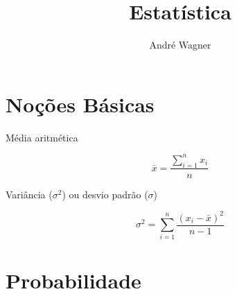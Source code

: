 \documentclass[a4paper, twocolumn]{article}
\author{André Wagner}
\title{Estatística}
\date{}
\begin{document}
\section{Noções Básicas}

Média aritmética

\[ \bar{x} = \frac{\displaystyle\sum^n_{i=1} x_i}{n} \]

Variância ($\sigma^2$) ou desvio padrão ($\sigma$)

\[ \sigma^2 = \sum^n_{i=1} \frac{(x_i-\bar{x})^2}{n-1} \]

\section{Probabilidade}

\end{document}
